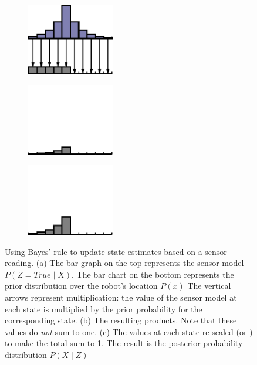 \begin{figure}
  \begin{center}
    \begin{subfigure}[b]{0.3\textwidth}
      \includegraphics[width=1.5in]{probability/figs/Bayes1.pdf}
      \caption{ }
    \end{subfigure}
    \begin{subfigure}[b]{0.3\textwidth}
      \includegraphics[width=1.5in]{probability/figs/Bayes2.pdf}
      \caption{}
    \end{subfigure}
    \begin{subfigure}[b]{0.3\textwidth}
      \includegraphics[width=1.5in]{probability/figs/Bayes3.pdf}
      \caption{}
    \end{subfigure}
  \end{center}
  \caption{Using Bayes' rule to update state estimates based on a
    sensor reading. (a) The bar graph on the top represents the sensor
    model $P(Z=True \mid X)$.  The bar chart on the bottom represents
    the prior distribution over the robot's location $P(x)$ The
    vertical arrows represent multiplication: the value of the sensor
    model at each state is multiplied by the prior probability for the
    corresponding state. (b) The resulting products. Note that these
    values do \emph{not} sum to one.  (c) The values at each state
    re-scaled (or ) to make the total sum to 1. The
    result is the posterior probability distribution $P(X \mid Z)$}
  \label{fig:bayes}
\end{figure}

